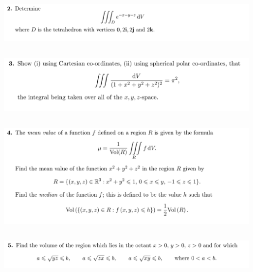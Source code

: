\documentclass[12pt]{article}
\begin{document}
\subsection{}
\begin{mdframed}
  \includegraphics[width=400pt]{img/oxford-prelims-M5-multivariable-calc-3-2.png}
\end{mdframed}

\subsection{}
\begin{mdframed}
  \includegraphics[width=400pt]{img/oxford-prelims-M5-multivariable-calc-3-3.png}
\end{mdframed}

\subsection{}
\begin{mdframed}
  \includegraphics[width=400pt]{img/oxford-prelims-M5-multivariable-calc-3-4.png}
\end{mdframed}

\subsection{}
\begin{mdframed}
  \includegraphics[width=400pt]{img/oxford-prelims-M5-multivariable-calc-3-5.png}
\end{mdframed}
\end{document}
